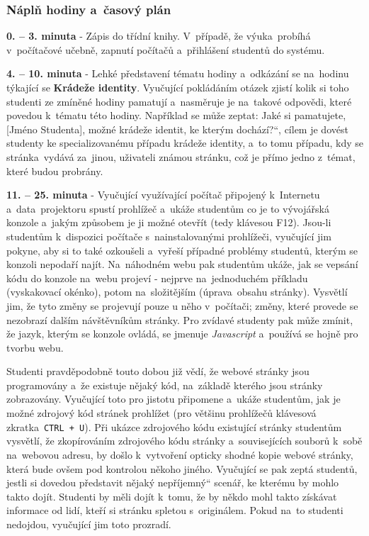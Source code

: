 \documentclass[a4paper, 12pt]{article}
\providecommand{\uv}[1]{\quotedblbase #1\textquotedblleft}
\begin{document}
\subsubsection{Náplň hodiny a~časový plán}
\indent\textbf{0. -- 3. minuta} - Zápis do třídní knihy. V~případě, že výuka~probíhá v~počítačové učebně, zapnutí počítačů a~přihlášení studentů do systému.

\textbf{4. -- 10. minuta} - Lehké představení tématu hodiny a~odkázání se na~hodinu týkající se \textbf{Krádeže identity}. Vyučující pokládáním otázek zjistí kolik si toho studenti ze zmíněné hodiny pamatují a~nasměruje je na~takové odpovědi, které povedou k~tématu této hodiny. Například se může zeptat: \uv{Jaké si pamatujete, [Jméno Studenta], možné krádeže identit, ke kterým dochází?}, cílem je dovést studenty ke specializovanému případu krádeže identity, a~to tomu případu, kdy se stránka~vydává za~jinou, uživateli známou stránku, což je přímo jedno z~témat, které budou probrány.

\textbf{11. -- 25. minuta} - Vyučující využívající počítač připojený k~Internetu a~data~projektoru spustí prohlížeč a~ukáže studentům co je to vývojářská konzole a~jakým způsobem je ji možné otevřít (tedy klávesou F12). Jsou-li studentům k~dispozici počítače s~nainstalovanými prohlížeči, vyučující jim pokyne, aby si to také ozkoušeli a~vyřeší případné problémy studentů, kterým se konzoli nepodaří najít. Na~náhodném webu pak studentům ukáže, jak se vepsání kódu do konzole na~webu projeví - nejprve na~jednoduchém příkladu (vyskakovací okénko), potom na~složitějším (úprava~obsahu stránky). Vysvětlí jim, že tyto změny se projevují pouze u něho v~počítači; změny, které provede se nezobrazí dalším návštěvníkům stránky. Pro zvídavé studenty pak může zmínit, že jazyk, kterým se konzole ovládá, se jmenuje \textit{Javascript} a~používá se hojně pro tvorbu webu. 

Studenti pravděpodobně touto dobou již vědí, že webové stránky jsou programovány a~že existuje nějaký kód, na~základě kterého jsou stránky zobrazovány. Vyučující toto pro jistotu připomene a~ukáže studentům, jak je možné zdrojový kód stránek prohlížet (pro většinu prohlížečů klávesová zkratka~\texttt{CTRL + U}). Při ukázce zdrojového kódu existující stránky studentům vysvětlí, že zkopírováním zdrojového kódu stránky a~souvisejících souborů k~sobě na~webovou adresu, by došlo k~vytvoření opticky shodné kopie webové stránky, která bude ovšem pod kontrolou někoho jiného. Vyučující se pak zeptá studentů, jestli si dovedou představit nějaký \uv{nepříjemný} scenář, ke kterému by mohlo takto dojít. Studenti by měli dojít k~tomu, že by někdo mohl takto získávat informace od lidí, kteří si stránku spletou s~originálem. Pokud na~to studenti nedojdou, vyučující jim toto prozradí.
\end{document}
